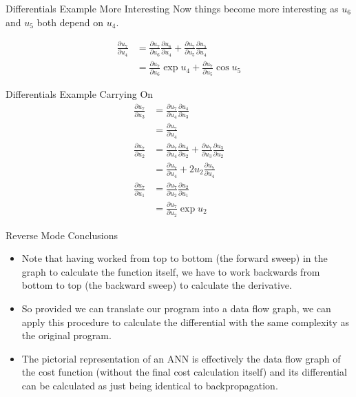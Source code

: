 \documentclass{beamer}
\begin{document}
\begin{frame}[fragile]{Differentials Example More Interesting}
Now things become more interesting as $u_6$ and $u_5$ both depend on
$u_4$.

$$
\begin{aligned}
\frac{\partial u_7}{\partial u_4} &=
 \frac{\partial u_7}{\partial u_6}\frac{\partial u_6}{\partial u_4} +
 \frac{\partial u_7}{\partial u_5}\frac{\partial u_5}{\partial u_4} \\
&= \frac{\partial u_7}{\partial u_6}\exp{u_4} +
   \frac{\partial u_7}{\partial u_5}\cos{u_5}
\end{aligned}
$$
\end{frame}

\begin{frame}[fragile]{Differentials Example Carrying On}
$$
\begin{aligned}
\frac{\partial u_7}{\partial u_3} &=
 \frac{\partial u_7}{\partial u_4}\frac{\partial u_4}{\partial u_3} \\
&= \frac{\partial u_7}{\partial u_4} \\
\frac{\partial u_7}{\partial u_2} &=
 \frac{\partial u_7}{\partial u_4}\frac{\partial u_4}{\partial u_2} +
 \frac{\partial u_7}{\partial u_3}\frac{\partial u_3}{\partial u_2} \\
&= \frac{\partial u_7}{\partial u_4} + 2u_2\frac{\partial u_7}{\partial u_4} \\
\frac{\partial u_7}{\partial u_1} &=
 \frac{\partial u_7}{\partial u_2}\frac{\partial u_2}{\partial u_1} \\
&=\frac{\partial u_7}{\partial u_2}\exp{u_2}
\end{aligned}
$$
\end{frame}

\begin{frame}[fragile]{Reverse Mode Conclusions}
\begin{itemize}
\item
Note that having worked from top to bottom (the forward sweep) in the
graph to calculate the function itself, we have to work backwards from
bottom to top (the backward sweep) to calculate the derivative.
\item
So provided we can translate our program into a data flow graph, we can
apply this procedure to calculate the differential with the same
complexity as the original program.
\item
The pictorial representation of an ANN is effectively the data flow
graph of the cost function (without the final cost calculation itself)
and its differential can be calculated as just being identical to
backpropagation.
\end{itemize}
\end{frame}
\end{document}
